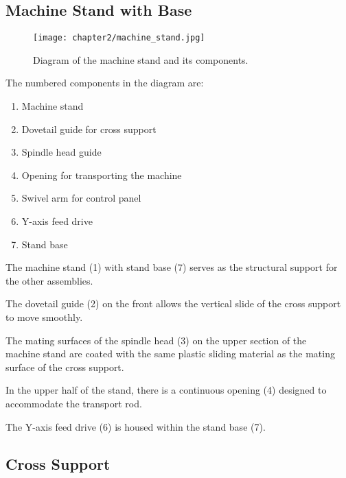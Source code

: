 
\setcounter{section}{2}
\setcounter{page}{2}

\subsection{Machine Stand with Base}

\begin{figure}[h]
    \centering
    \texttt{[image: chapter2/machine\_stand.jpg]}
    \caption{Diagram of the machine stand and its components.}
    \label{fig:machine_stand}
\end{figure}

The numbered components in the diagram are:
\begin{enumerate}[itemsep=1pt,parsep=0pt]
    \item Machine stand
    \item Dovetail guide for cross support
    \item Spindle head guide
    \item Opening for transporting the machine
    \item Swivel arm for control panel
    \item Y-axis feed drive
    \item Stand base
\end{enumerate}

The machine stand (1) with stand base (7) serves as the structural support for the other assemblies.

The dovetail guide (2) on the front allows the vertical slide of the cross support to move smoothly.

The mating surfaces of the spindle head (3) on the upper section of the \\machine stand are coated with the same plastic sliding material as the mating surface of the cross support.

In the upper half of the stand, there is a continuous opening (4) designed to accommodate the transport rod.

The Y-axis feed drive (6) is housed within the stand base (7).

\vfill
\clearpage

\subsection{Cross Support}

